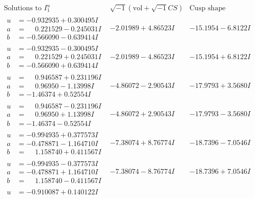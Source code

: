 \documentclass[1p]{elsarticle_modified}
\theoremstyle{definition}
\newcommand{\I}{\sqrt{-1}}
\begin{document}
$$\begin{array}{c|c|c}  
\text{Solutions to }I^u_{1}& \I (\text{vol} + \sqrt{-1}CS) & \text{Cusp shape}\\
 \hline 
\begin{aligned}
u &= -0.932935 + 0.300495 I \\
a &= \phantom{-}0.221529 - 0.245031 I \\
b &= -0.566090 - 0.639414 I\end{aligned}
 & -2.01989 + 4.86523 I & -15.1954 - 6.8122 I \\ \hline\begin{aligned}
u &= -0.932935 - 0.300495 I \\
a &= \phantom{-}0.221529 + 0.245031 I \\
b &= -0.566090 + 0.639414 I\end{aligned}
 & -2.01989 - 4.86523 I & -15.1954 + 6.8122 I \\ \hline\begin{aligned}
u &= \phantom{-}0.946587 + 0.231196 I \\
a &= \phantom{-}0.96950 - 1.13998 I \\
b &= -1.46374 + 0.52554 I\end{aligned}
 & -4.86072 - 2.90543 I & -17.9793 + 3.5680 I \\ \hline\begin{aligned}
u &= \phantom{-}0.946587 - 0.231196 I \\
a &= \phantom{-}0.96950 + 1.13998 I \\
b &= -1.46374 - 0.52554 I\end{aligned}
 & -4.86072 + 2.90543 I & -17.9793 - 3.5680 I \\ \hline\begin{aligned}
u &= -0.994935 + 0.377573 I \\
a &= -0.478871 - 1.164710 I \\
b &= \phantom{-}1.158740 + 0.411567 I\end{aligned}
 & -7.38074 + 8.76774 I & -18.7396 - 7.0546 I \\ \hline\begin{aligned}
u &= -0.994935 - 0.377573 I \\
a &= -0.478871 + 1.164710 I \\
b &= \phantom{-}1.158740 - 0.411567 I\end{aligned}
 & -7.38074 - 8.76774 I & -18.7396 + 7.0546 I \\ \hline\begin{aligned}
u &= -0.910087 + 0.140122 I \\

\end{aligned}
\end{array}$$
\end{document}
